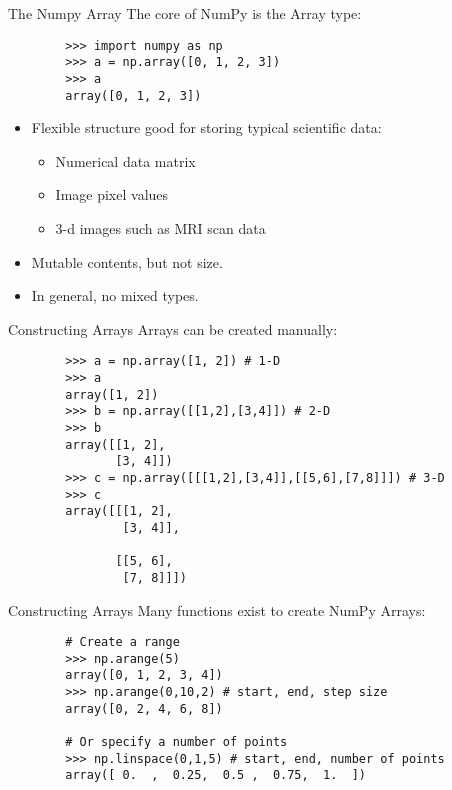 \documentclass[serif,xcolor=pdftex,dvipsnames,table,hyperref={bookmarks=false,breaklinks}]{beamer}
\begin{document}
\begin{frame}[t,fragile]{The Numpy Array}
	The core of NumPy is the Array type:
	
	\pause
	\begin{lstlisting}
		>>> import numpy as np
		>>> a = np.array([0, 1, 2, 3])
		>>> a
		array([0, 1, 2, 3])
	\end{lstlisting}
	
	\pause
	\begin{itemize}[<+->]
		\item Flexible structure good for storing typical scientific data:
		\begin{itemize}[<+->]
			\item Numerical data matrix
			\item Image pixel values
			\item 3-d images such as MRI scan data
		\end{itemize}
		\item Mutable contents, but not size.
		\item In general, no mixed types.
	\end{itemize}
\end{frame}

\begin{frame}[t,fragile]{Constructing Arrays}
	Arrays can be created manually:
	
	\pause
	\begin{lstlisting}
		>>> a = np.array([1, 2]) # 1-D
		>>> a
		array([1, 2])
		>>> b = np.array([[1,2],[3,4]]) # 2-D
		>>> b
		array([[1, 2],
		       [3, 4]])   
		>>> c = np.array([[[1,2],[3,4]],[[5,6],[7,8]]]) # 3-D
		>>> c
		array([[[1, 2],
		        [3, 4]],

		       [[5, 6],
		        [7, 8]]])
	\end{lstlisting}
	
\end{frame}

\begin{frame}[t,fragile]{Constructing Arrays}
	Many functions exist to create NumPy Arrays:
	
	\pause
	\begin{lstlisting}
		# Create a range
		>>> np.arange(5)
		array([0, 1, 2, 3, 4])
		>>> np.arange(0,10,2) # start, end, step size
		array([0, 2, 4, 6, 8])
		
		# Or specify a number of points
		>>> np.linspace(0,1,5) # start, end, number of points
		array([ 0.  ,  0.25,  0.5 ,  0.75,  1.  ])
	\end{lstlisting}
\end{frame}
\end{document}
